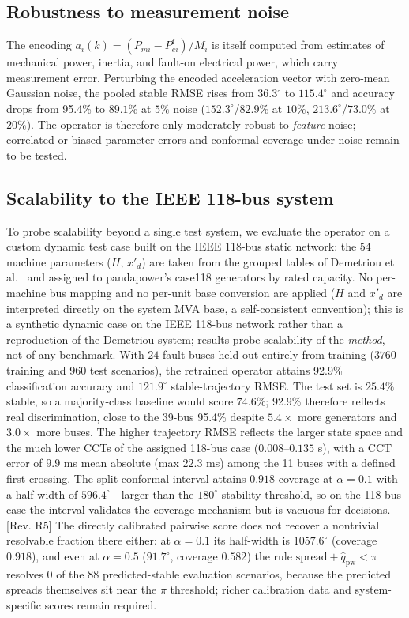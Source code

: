 \documentclass[5p,times]{elsarticle}
\newcommand{\rmseAll}{36.3}           %
\newcommand{\pctACC}{95.4\%}          %
\newcommand{\pctACCb}{92.9\%}         %
\begin{document}
\subsection{Robustness to measurement noise}
The encoding $a_i(k)=(P_{mi}-P_{ei}^{\mathrm{f}})/M_i$ is itself computed from estimates of
mechanical power, inertia, and fault-on electrical power, which carry measurement error.
Perturbing the encoded acceleration vector with zero-mean Gaussian noise, the pooled stable RMSE
rises from \rmseAll{}$^\circ$ to $115.4^\circ$ and accuracy drops from \pctACC{} to $89.1\%$ at
$5\%$ noise ($152.3^\circ$/$82.9\%$ at $10\%$, $213.6^\circ$/$73.0\%$ at $20\%$). The operator is therefore only moderately robust to
\emph{feature} noise; correlated or biased parameter errors and conformal coverage under noise
remain to be tested.

\subsection{Scalability to the IEEE 118-bus system}
To probe scalability beyond a single test system, we evaluate the operator on a custom dynamic
test case built on the IEEE 118-bus static network: the $54$ machine parameters ($H$, $x'_{d}$)
are taken from the grouped tables of Demetriou et al.~\cite{demetriou2017dynamic} and assigned to
pandapower's case118 generators by rated capacity. No per-machine bus mapping and no per-unit
base conversion are applied ($H$ and $x'_{d}$ are interpreted directly on the system MVA base,
a self-consistent convention); this is a synthetic dynamic case on the IEEE 118-bus network
rather than a reproduction of the Demetriou system; results probe scalability of the
\emph{method}, not of any benchmark. With $24$ fault buses held out entirely from training
($3760$ training and $960$ test scenarios), the retrained operator attains \pctACCb{}
classification accuracy and $121.9^\circ$ stable-trajectory RMSE. The test set is $25.4\%$
stable, so a majority-class baseline would score $74.6\%$; \pctACCb{} therefore reflects real
discrimination, close to the 39-bus \pctACC{} despite $5.4\times$ more generators and $3.0\times$
more buses. The higher trajectory RMSE reflects the larger state space and the much lower CCTs of
the assigned 118-bus case ($0.008$--$0.135$ s), with a CCT error of $9.9$ ms mean absolute (max
$22.3$ ms) among the 11 buses with a defined first crossing. The split-conformal interval attains $0.918$ coverage at
$\alpha{=}0.1$ with a half-width of $596.4^\circ$---larger than the $180^\circ$ stability
threshold, so on the 118-bus case the interval validates the coverage mechanism but is vacuous
for decisions. [Rev. R5] The directly calibrated pairwise
score does not recover a nontrivial resolvable fraction there either: at $\alpha{=}0.1$ its
half-width is $1057.6^\circ$ (coverage $0.918$), and even at $\alpha{=}0.5$ ($91.7^\circ$,
coverage $0.582$) the rule $\mathrm{spread}+\hat q_{\mathrm{pw}}<\pi$ resolves $0$ of the $88$
predicted-stable evaluation scenarios, because the predicted spreads themselves sit near the
$\pi$ threshold; richer calibration data and system-specific scores remain required.
\end{document}
